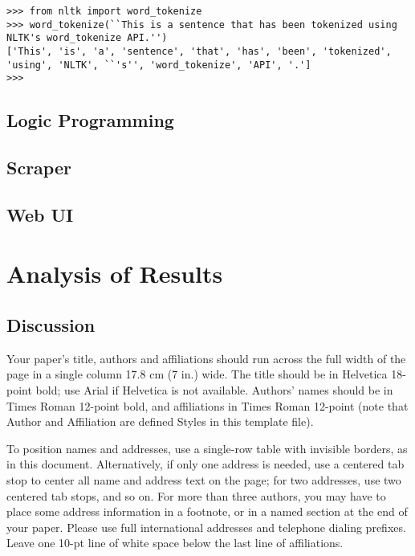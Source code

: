 \documentclass{chi2009}
\begin{document}
\begin{lstlisting}[caption=NLTK Tokenization Example, label=tokList]
>>> from nltk import word_tokenize
>>> word_tokenize(``This is a sentence that has been tokenized using NLTK's word_tokenize API.'')
['This', 'is', 'a', 'sentence', 'that', 'has', 'been', 'tokenized', 'using', 'NLTK', ``'s'', 'word_tokenize', 'API', '.']
>>> 
\end{lstlisting}



\subsection{Logic Programming}

\subsection{Scraper}

\subsection{Web UI}


\section{Analysis of Results}


\subsection{Discussion}

Your paper's title, authors and affiliations should run across the
full width of the page in a single column 17.8 cm (7 in.) wide.  The
title should be in Helvetica 18-point bold; use Arial if Helvetica is
not available.  Authors' names should be in Times Roman 12-point bold,
and affiliations in Times Roman 12-point (note that Author and
Affiliation are defined Styles in this template file).

To position names and addresses, use a single-row table with invisible
borders, as in this document.  Alternatively, if only one address is
needed, use a centered tab stop to center all name and address text on
the page; for two addresses, use two centered tab stops, and so
on. For more than three authors, you may have to place some address
information in a footnote, or in a named section at the end of your
paper. Please use full international addresses and telephone dialing
prefixes.  Leave one 10-pt line of white space below the last line of
affiliations.
\end{document}
